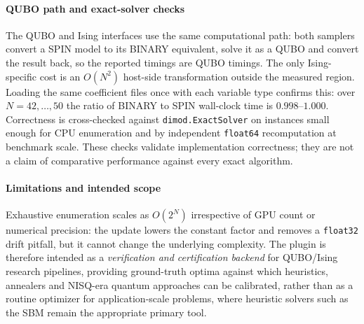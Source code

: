 \documentclass[12pt,a4paper]{elsarticle}
\begin{document}
\paragraph{QUBO path and exact-solver checks}
The QUBO and Ising interfaces use the same computational path: both samplers convert a SPIN
model to its BINARY equivalent, solve it as a QUBO and convert the result back, so the reported
timings are QUBO timings. The only Ising-specific cost is an $O(N^{2})$ host-side
transformation outside the measured region. Loading the same coefficient files once with each
variable type confirms this: over $N=42,\dots,50$ the ratio of BINARY to SPIN wall-clock time
is $0.998$--$1.000$. Correctness is cross-checked against \texttt{dimod.ExactSolver} on
instances small enough for CPU enumeration and by independent \texttt{float64} recomputation
at benchmark scale. These checks validate implementation correctness; they are not a claim of
comparative performance against every exact algorithm.

\paragraph{Limitations and intended scope}
Exhaustive enumeration scales as $O(2^N)$ irrespective of GPU count or
numerical precision: the update lowers the constant factor and removes a
\texttt{float32} drift pitfall, but it cannot change the underlying
complexity. The plugin is therefore intended as a \emph{verification and
certification backend} for QUBO/Ising research pipelines, providing
ground-truth optima against which heuristics, annealers and NISQ-era
quantum approaches can be calibrated, rather than as a routine optimizer
for application-scale problems, where heuristic solvers such as the SBM
remain the appropriate primary tool.
\end{document}
